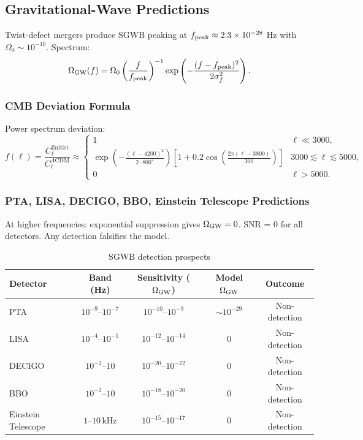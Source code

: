 \documentclass[11pt]{article}
\begin{document}
\subsection{Gravitational-Wave Predictions}
Twist-defect mergers produce SGWB peaking at $f_{\rm peak} \approx 2.3 \times 10^{-28}$ Hz with $\Omega_0 \sim 10^{-10}$. Spectrum:
\[
\Omega_{\rm GW}(f) = \Omega_0 \left( \frac{f}{f_{\rm peak}} \right)^{-1} \exp\left( -\frac{(f - f_{\rm peak})^2}{2\sigma_f^2} \right).
\]

\subsubsection{CMB Deviation Formula}
Power spectrum deviation:
\[
f(\ell) = \frac{C_\ell^{\text{finitist}}}{C_\ell^{\Lambda\text{CDM}}} \approx
\begin{cases}
1 & \ell \ll 3000, \\
\exp\left( -\frac{(\ell - 4200)^2}{2 \cdot 800^2} \right) \left[ 1 + 0.2 \cos\left( \frac{2\pi (\ell - 3800)}{300} \right) \right] & 3000 \lesssim \ell \lesssim 5000, \\
0 & \ell > 5000.
\end{cases}
\]

\subsubsection{PTA, LISA, DECIGO, BBO, Einstein Telescope Predictions}
At higher frequencies: exponential suppression gives $\Omega_{\rm GW} = 0$. SNR = 0 for all detectors. Any detection falsifies the model.

\begin{table}[h]
\centering
\caption{SGWB detection prospects}
\begin{tabular}{lcccc}
\toprule
Detector & Band (Hz) & Sensitivity ($\Omega_{\rm GW}$) & Model $\Omega_{\rm GW}$ & Outcome \\
\midrule
PTA & $10^{-9}$--$10^{-7}$ & $10^{-10}$--$10^{-9}$ & $\sim 10^{-29}$ & Non-detection \\
LISA & $10^{-4}$--$10^{-1}$ & $10^{-12}$--$10^{-14}$ & 0 & Non-detection \\
DECIGO & $10^{-2}$--$10$ & $10^{-20}$--$10^{-22}$ & 0 & Non-detection \\
BBO & $10^{-2}$--$10$ & $10^{-18}$--$10^{-20}$ & 0 & Non-detection \\
Einstein Telescope & $1$--$10\,\text{kHz}$ & $10^{-15}$--$10^{-17}$ & 0 & Non-detection \\
\bottomrule
\end{tabular}
\end{table}
\end{document}
